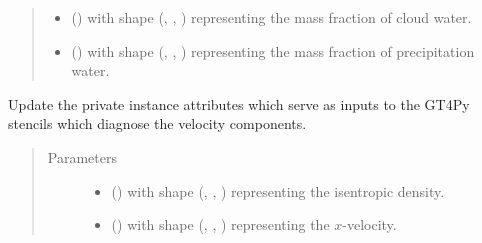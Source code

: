 \documentclass[letterpaper,10pt,english]{sphinxmanual}
\begin{document}
\begin{fulllineitems}
\begin{fulllineitems}
\begin{quote}
\begin{description}
\begin{itemize}
\item {} 
 () \textendash{}  with shape (, , ) representing the mass fraction of
cloud water.

\item {} 
 () \textendash{}  with shape (, , ) representing the mass fraction of
precipitation water.

\end{itemize}

\end{description}\end{quote}

\end{fulllineitems}


\begin{fulllineitems}
\label{\detokenize{api:dycore.diagnostic_isentropic.DiagnosticIsentropic._stencils_diagnosing_velocity_set_inputs}}
Update the private instance attributes which serve as inputs to the GT4Py stencils which diagnose
the velocity components.
\begin{quote}\begin{description}
\item[{Parameters}] \leavevmode\begin{itemize}
\item {} 
 () \textendash{}  with shape (, , ) representing the isentropic density.

\item {} 
 () \textendash{}  with shape (, , ) representing the \(x\)-velocity.


\end{itemize}
\end{description}
\end{quote}
\end{fulllineitems}
\end{fulllineitems}
\end{document}
